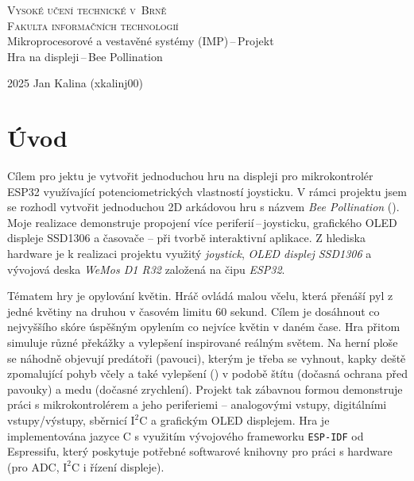 \documentclass[11pt,a4paper]{article}
\begin{document}

\begin{titlepage}
    \begin{center}
        \Huge{\textsc{Vysoké učení technické v~Brně}\\}
        \vspace{0.5em}
        \huge\textsc{Fakulta informačních technologií}\\
        {\huge Mikroprocesorové a vestavěné systémy (IMP)\,--\,Projekt\\
                \vspace{0.6em}
                Hra na displeji\,--\,Bee Pollination\\}
    \end{center}
    \Large 2025 \hfill Jan Kalina (xkalinj00)
\end{titlepage}

\newpage



{
    \hypersetup{linkcolor=black}
    \tableofcontents
}

\newpage



\section{Úvod}

Cílem pro jektu je vytvořit jednoduchou hru na displeji pro mikrokontrolér ESP32\cite{reference} využívající potenciometrických vlastností joysticku. V rámci projektu jsem se rozhodl vytvořit
jednoduchou 2D arkádovou hru s názvem \emph{Bee Pollination} (). Moje realizace demonstruje propojení více periferií\,--\,joysticku, grafického OLED displeje SSD1306 a časovače -- při
tvorbě interaktivní aplikace. Z hlediska hardware je k realizaci projektu využitý \emph{joystick}, \emph{OLED displej SSD1306} a vývojová deska \emph{WeMos D1 R32} založená na čipu \emph{ESP32}. 

Tématem hry je opylování květin. Hráč ovládá malou včelu, která přenáší pyl z jedné květiny na druhou v časovém limitu 60 sekund. Cílem je dosáhnout co nejvyššího skóre úspěšným
opylením co nejvíce květin v daném čase. Hra přitom simuluje různé překážky a vylepšení inspirované reálným světem. Na herní ploše se náhodně objevují predátoři (pavouci), kterým je
třeba se vyhnout, kapky deště zpomalující pohyb včely a také vylepšení () v podobě štítu (dočasná ochrana před pavouky) a medu (dočasné zrychlení). Projekt tak zábavnou
formou demonstruje práci s mikrokontrolérem a jeho periferiemi -- analogovými vstupy, digitálními vstupy/výstupy, sběrnicí $\text{I}^2\text{C}$ a grafickým OLED displejem.
Hra je implementována jazyce C s využitím vývojového frameworku \texttt{ESP-IDF} od Espressifu, který poskytuje potřebné softwarové knihovny pro práci s hardware (pro ADC, $\text{I}^2\text{C}$ i řízení displeje).
\end{document}
